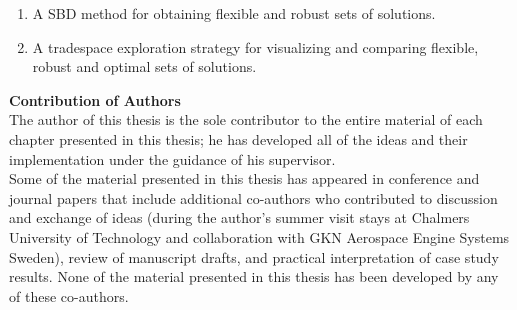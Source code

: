 \documentclass[12pt,Bold,letterpaper,TexShade,twoside]{mcgilletdclass}
\begin{document}
\begin{romanPagenumber}{2}
{\begin{enumerate}
\begin{enumerate}
		\item{A \acl{SBD} method for obtaining flexible and robust sets of solutions.}
		\item{A tradespace exploration strategy for visualizing and comparing flexible, robust and optimal sets of solutions.}
	\end{enumerate}
\end{enumerate}
%
\textbf{Contribution of Authors}\\
%
The author of this thesis is the sole contributor to the entire material of each chapter presented in this thesis; he has developed all of the ideas and their implementation under the guidance of his supervisor.\\
%
Some of the material presented in this thesis has appeared in conference and journal papers that include additional co-authors who contributed to discussion and exchange of ideas (during the author's summer visit stays at Chalmers University of Technology and collaboration with GKN Aerospace Engine Systems Sweden), review of manuscript drafts, and practical interpretation of case study results. None of the material presented in this thesis has been developed by any of these co-authors.
}%
\Contribution%


\end{romanPagenumber}
\end{document}
